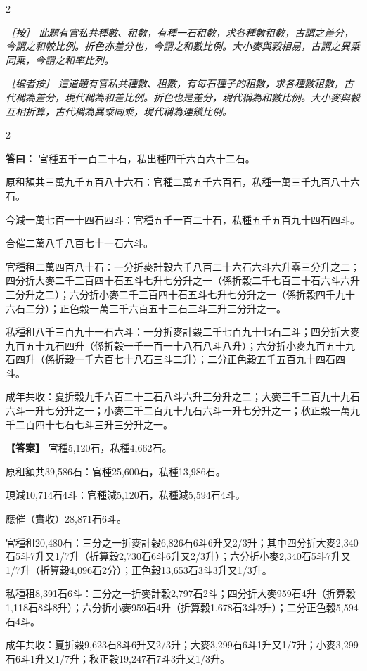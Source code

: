 \documentclass[11pt,a4paper]{article}
\newcommand{\ClassicalAnswer}[1]{\par\noindent\textbf{\color{answercolor}答曰：}#1\par}
\newcommand{\ClassicalNote}[1]{\par\noindent\textit{［按］#1}\par}
\newcommand{\ModernAnswer}[1]{\par\noindent\textbf{\color{answercolor}【答案】}#1\par}
\newcommand{\ModernNote}[1]{\par\noindent\textit{\color{notecolor}［编者按］#1}\par}
\begin{document}
\begin{paracol}{2}

\ClassicalNote{%
此題有官私共種數、租數，有種一石租數，求各種數租數，古謂之差分，今謂之和較比例。折色亦差分也，今謂之和數比例。大小麥與榖相易，古謂之異乗同乗，今謂之和率比列。}

\switchcolumn

\ModernNote{%
這道題有官私共種數、租數，有每石種子的租數，求各種數租數，古代稱為差分，現代稱為和差比例。折色也是差分，現代稱為和數比例。大小麥與穀互相折算，古代稱為異乘同乘，現代稱為連鎖比例。
}

\end{paracol}

\begin{paracol}{2}

\ClassicalAnswer{%
官種五千一百二十石，私出種四千六百六十二石。

原租額共三萬九千五百八十六石：官種二萬五千六百石，私種一萬三千九百八十六石。

今減一萬七百一十四石四斗：官種五千一百二十石，私種五千五百九十四石四斗。

合催二萬八千八百七十一石六斗。

官種租二萬四百八十石：一分折麥計榖六千八百二十六石六斗六升零三分升之二；四分折大麥二千三百四十石五斗七升七分升之一（係折榖二千七百三十石六斗六升三分升之二）；六分折小麥二千三百四十石五斗七升七分升之一（係折榖四千九十六石二分）；正色榖一萬三千六百五十三石三斗三升三分升之一。

私種租八千三百九十一石六斗：一分折麥計榖二千七百九十七石二斗；四分折大麥九百五十九石四升（係折榖一千一百一十八石八斗八升）；六分折小麥九百五十九石四升（係折榖一千六百七十八石三斗二升）；二分正色榖五千五百九十四石四斗。

成年共收：夏折榖九千六百二十三石八斗六升三分升之二；大麥三千二百九十九石六斗一升七分升之一；小麥三千二百九十九石六斗一升七分升之一；秋正榖一萬九千二百四十七石七斗三升三分升之一。}

\switchcolumn

\ModernAnswer{%
官種5,120石，私種4,662石。

原租額共39,586石：官種25,600石，私種13,986石。

現減10,714石4斗：官種減5,120石，私種減5,594石4斗。

應催（實收）28,871石6斗。

官種租20,480石：三分之一折麥計穀6,826石6斗6升又2/3升；其中四分折大麥2,340石5斗7升又1/7升（折算穀2,730石6斗6升又2/3升）；六分折小麥2,340石5斗7升又1/7升（折算穀4,096石2分）；正色穀13,653石3斗3升又1/3升。

私種租8,391石6斗：三分之一折麥計穀2,797石2斗；四分折大麥959石4升（折算穀1,118石8斗8升）；六分折小麥959石4升（折算穀1,678石3斗2升）；二分正色穀5,594石4斗。

成年共收：夏折穀9,623石8斗6升又2/3升；大麥3,299石6斗1升又1/7升；小麥3,299石6斗1升又1/7升；秋正穀19,247石7斗3升又1/3升。
}

\end{paracol}
\end{document}
